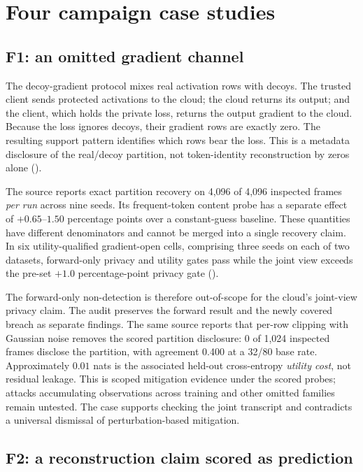 \section{Four campaign case studies}
\label{sec:cases}

\subsection{F1: an omitted gradient channel}
\label{sec:f1}

The decoy-gradient protocol mixes real activation rows with decoys. The
trusted client sends protected activations to the cloud; the cloud returns
its output; and the client, which holds the private loss, returns the output
gradient to the cloud. Because the loss ignores decoys, their gradient rows
are exactly zero. The resulting support pattern identifies which rows bear
the loss. This is a metadata disclosure of the real/decoy partition, not
token-identity reconstruction by zeros alone\citep{paper1} ().

The source reports exact partition recovery on 4,096 of 4,096 inspected
frames \emph{per run} across nine seeds. Its frequent-token content probe
has a separate effect of $+0.65$--$1.50$ percentage points over a
constant-guess baseline. These quantities have different denominators and
cannot be merged into a single recovery claim. In six utility-qualified
gradient-open cells, comprising three seeds on each of two datasets,
forward-only privacy and utility gates pass while the joint view exceeds
the pre-set $+1.0$ percentage-point privacy gate ().

The forward-only non-detection is therefore out-of-scope for the cloud's
joint-view privacy claim. The audit preserves the forward result and the
newly covered breach as separate findings.
The same source reports that per-row clipping with Gaussian noise removes
the scored partition disclosure: 0 of 1,024 inspected frames disclose the
partition, with agreement 0.400 at a 32/80 base rate. Approximately
$0.01$ nats is the associated held-out cross-entropy \emph{utility cost},
not residual leakage. This is scoped mitigation evidence under the scored
probes; attacks accumulating observations across training and other omitted
families remain untested. The case supports checking the joint transcript
and contradicts a universal dismissal of perturbation-based mitigation.

\subsection{F2: a reconstruction claim scored as prediction}
\label{sec:f2}

